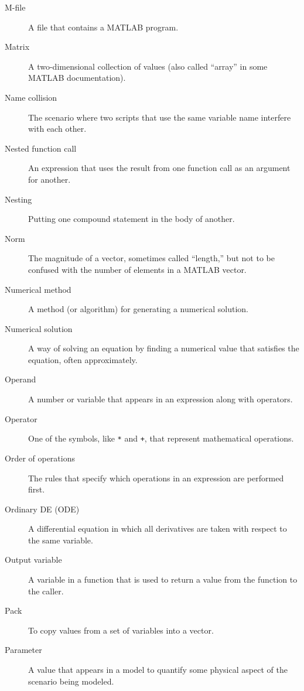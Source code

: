 \begin{description}
\item[M-file] A file that contains a MATLAB program.

\item[Matrix] A two-dimensional collection of values (also called
``array'' in some MATLAB documentation).

\item[Name collision] The scenario where two scripts that use the
same variable name interfere with each other.

\item[Nested function call] An expression that uses the result from
one function call as an argument for another.

\item[Nesting] Putting one compound statement in the body of another.

\item[Norm] The magnitude of a vector, sometimes called ``length,''
but not to be confused with the number of elements in a MATLAB
vector.

\item[Numerical method] A method (or algorithm) for generating
a numerical solution.

\item[Numerical solution] A way of solving an equation by finding
a numerical value that satisfies the equation, often approximately.

\item[Operand] A number or variable that appears in an expression along
with operators.

\item[Operator] One of the symbols, like \lstinline{*} and \lstinline{+}, that
represent mathematical operations.

\item[Order of operations] The rules that specify which operations
in an expression are performed first.

\item[Ordinary DE (ODE)] A differential equation in which all derivatives are taken with
respect to the same variable.

\item[Output variable] A variable in a function that is used to
return a value from the function to the caller.

\item[Pack] To copy values from a set of variables into a vector.

\item[Parameter] A value that appears in a model to quantify some
physical aspect of the scenario being modeled.


\end{description}
